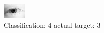 \begin{figure}[h!]
\begin{center}
\includegraphics[width=0.60\columnwidth]{figures/ID1_class_4_target_3.png}
\end{center}
\caption{ Classification: 4 actual target: 3}
\label{fig:ID1_class_4_target_3}
\end{figure}
